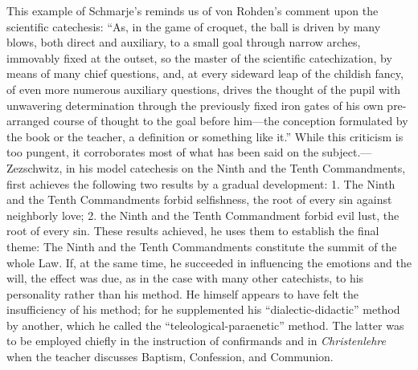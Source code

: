 This example of Schmarje’s reminds us of von Rohden’s comment upon the scientific catechesis: “As, in the game of croquet, the ball is driven by many blows, both direct and auxiliary, to a small goal through narrow arches, immovably fixed at the outset, so the master of the scientific catechization, by means of many chief questions, and, at every sideward leap of the childish fancy, of even more numerous auxiliary questions, drives the thought of the pupil with unwavering determination through the previously fixed iron gates of his own pre-arranged course of thought to the goal before him—the conception formulated by the book or the teacher, a definition or something like it.” While this criticism is too pungent, it corroborates most of what has been said on the subject.—Zezschwitz, in his model catechesis on the Ninth and the Tenth Commandments, first achieves the following two results by a gradual development: 1. The Ninth and the Tenth Commandments forbid selfishness, the root of every sin against neighborly love; 2. the Ninth and the Tenth Commandment forbid evil lust, the root of every sin. These results achieved, he uses them to establish the final theme: The Ninth and the Tenth Commandments constitute the summit of the whole Law. If, at the same time, he succeeded in influencing the emotions and the will, the effect was due, as in the case with many other catechists, to his personality rather than his method. He himself appears to have felt the insufficiency of his method; for he supplemented his “dialectic-didactic” method by another, which he
called the “teleological-paraenetic” method. The latter was to be employed chiefly in the instruction of confirmands and in \emph{Christenlehre} when the teacher discusses Baptism, Confession, and Communion.

